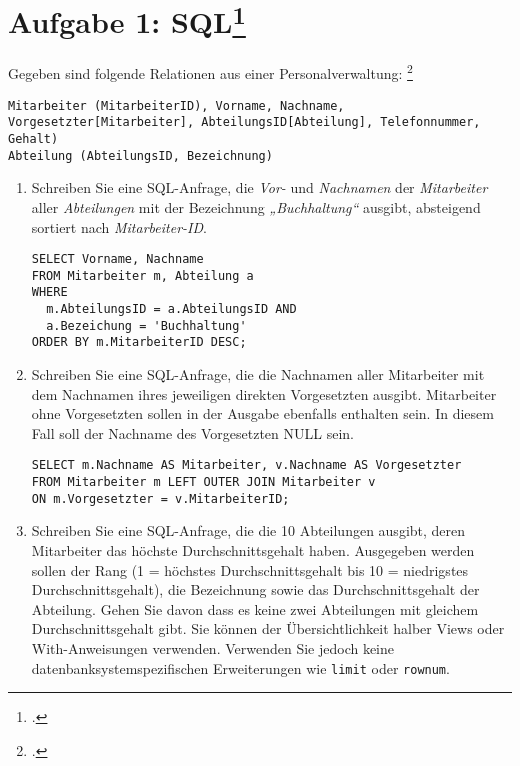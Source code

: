 \documentclass{lehramt-informatik-minimal}
\begin{document}
\section{Aufgabe 1: SQL\footcite{db:pu:3}}

Gegeben sind folgende Relationen aus einer Personalverwaltung:
\footcite[DB/ST - Herbst 2016 (vertieft - 66116), Thema 1 Teilaufgabe 1 Aufgabe 4]{examen:66116:2016:09}

\begin{verbatim}
Mitarbeiter (MitarbeiterID), Vorname, Nachname, Vorgesetzter[Mitarbeiter], AbteilungsID[Abteilung], Telefonnummer, Gehalt)
Abteilung (AbteilungsID, Bezeichnung)
\end{verbatim}

\renewcommand{\labelenumi}{(\alph{enumi})}
\begin{enumerate}


\item Schreiben Sie eine SQL-Anfrage, die \emph{Vor-} und
\emph{Nachnamen} der \emph{Mitarbeiter} aller \emph{Abteilungen} mit der
Bezeichnung \emph{„Buchhaltung“} ausgibt, absteigend sortiert nach
\emph{Mitarbeiter-ID}.

\begin{antwort}
\begin{verbatim}
SELECT Vorname, Nachname
FROM Mitarbeiter m, Abteilung a
WHERE
  m.AbteilungsID = a.AbteilungsID AND
  a.Bezeichung = 'Buchhaltung'
ORDER BY m.MitarbeiterID DESC;
\end{verbatim}
\end{antwort}


\item Schreiben Sie eine SQL-Anfrage, die die Nachnamen aller
Mitarbeiter mit dem Nachnamen ihres jeweiligen direkten Vorgesetzten
ausgibt. Mitarbeiter ohne Vorgesetzten sollen in der Ausgabe ebenfalls
enthalten sein. In diesem Fall soll der Nachname des Vorgesetzten NULL
sein.

\begin{antwort}
\begin{verbatim}
SELECT m.Nachname AS Mitarbeiter, v.Nachname AS Vorgesetzter
FROM Mitarbeiter m LEFT OUTER JOIN Mitarbeiter v
ON m.Vorgesetzter = v.MitarbeiterID;
\end{verbatim}
\end{antwort}


\item Schreiben Sie eine SQL-Anfrage, die die 10 Abteilungen ausgibt,
deren Mitarbeiter das höchste Durchschnittsgehalt haben. Ausgegeben
werden sollen der Rang (1 = höchstes Durchschnittsgehalt bis 10 =
niedrigstes Durchschnittsgehalt), die Bezeichnung sowie das
Durchschnittsgehalt der Abteilung. Gehen Sie davon dass es keine zwei
Abteilungen mit gleichem Durchschnittsgehalt gibt. Sie können der
Übersichtlichkeit halber Views oder With-Anweisungen verwenden.
Verwenden Sie jedoch keine datenbanksystemspezifischen Erweiterungen wie
\verb|limit| oder \verb|rownum|.


\end{enumerate}
\end{document}
